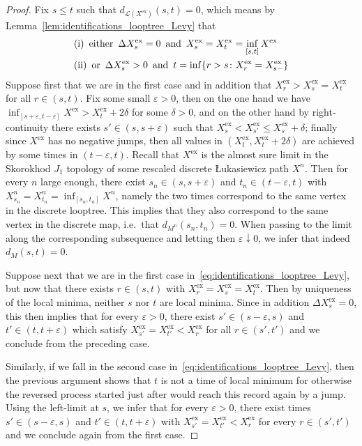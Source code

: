 \documentclass[british, a4paper,11pt]{article}
\numberwithin{equation}{section}
\theoremstyle{definition}
\newcommand{\Loop}{\mathscr{L}}
\newcommand{\Map}{M}
\newcommand{\exc}{\mathrm{ex}}
\begin{document}
\begin{proof}
Fix $s \leq t$ such that $d_{\Loop(X^{\exc})}(s,t) = 0$, which means by Lemma~\ref{lem:identifications_looptree_Levy} that
\begin{equation}\label{eq:identifications_looptree_Levy}
\begin{aligned}
&\text{(i)}\enskip \text{either}\enskip \Delta X^{\exc}_s = 0 \enskip\text{and}\enskip X^{\exc}_s = X^{\exc}_t = \inf_{[s,t]} X^{\exc}
\\
&\text{(ii)}\enskip \text{or}\enskip \Delta X^{\exc}_s > 0 \enskip\text{and}\enskip t = \inf\{r > s \colon X^{\exc}_r = X^{\exc}_{s-}\}
\end{aligned}
\end{equation}
Suppose first that we are in the first case and in addition that $X^{\exc}_r > X^{\exc}_s=X^{\exc}_t$ for all $r \in (s,t)$. 
Fix some small $\varepsilon>0$, then on the one hand we have $\inf_{[s+\varepsilon, t-\varepsilon]} X^{\exc} > X^{\exc}_t + 2\delta$ for some $\delta > 0$, and on the other hand by right-continuity there exists $s' \in (s, s+\varepsilon)$ such that $X^{\exc}_s < X^{\exc}_{s'} \leq X^{\exc}_s+\delta$; finally since $X^{\exc}$ has no negative jumps, then all values in $(X^{\exc}_t, X^{\exc}_t + 2\delta)$ are achieved by some times in $(t-\varepsilon, t)$.
Recall that $X^{\exc}$ is the almost sure limit in the Skorokhod $J_{1}$ topology of some rescaled discrete {\L}ukasiewicz path $X^n$. 
Then for every $n$ large enough, there exist $s_n \in (s, s+\varepsilon)$ and $t_n \in (t-\varepsilon, t)$ with $X^n_{s_n} = X^n_{t_n} = \inf_{[s_n,t_n]} X^n$, namely the two times correspond to the same vertex in the discrete looptree. This implies that they also correspond to the same vertex in the discrete map, i.e.~that $d_{M^n}(s_n,t_n)=0$. When passing to the limit along the corresponding subsequence and letting then $\varepsilon \downarrow 0$, we infer that indeed $d_\Map(s,t)=0$.

Suppose next that we are in the first case in~\eqref{eq:identifications_looptree_Levy}, but now that there exists $r \in (s,t)$ with $X^{\exc}_r = X^{\exc}_s = X^{\exc}_t$. Then by uniqueness of the local minima, neither $s$ nor $t$ are local minima. 
Since in addition $\Delta X^{\exc}_s=0$,  this then implies that for every $\varepsilon>0$, there exist $s' \in (s-\varepsilon,s)$ and $t' \in (t, t+\varepsilon)$ which satisfy $X^{\exc}_{s'} = X^{\exc}_{t'} < X^{\exc}_r$ for all $r \in (s',t')$ and we conclude from the preceding case.

Similarly, if we fall in the second case in~\eqref{eq:identifications_looptree_Levy}, then the previous argument shows that $t$ is not a time of local minimum for otherwise the reversed process started just after would reach this record again by a jump. Using the left-limit at $s$, we infer that for every $\varepsilon>0$, there exist times $s' \in (s-\varepsilon, s)$ and $t' \in (t, t+\varepsilon)$ with $X^{\exc}_{s'} = X^{\exc}_{t'} < X^{\exc}_r$ for every $r \in (s',t')$ and we conclude again from the first case.
\end{proof}
\end{document}
